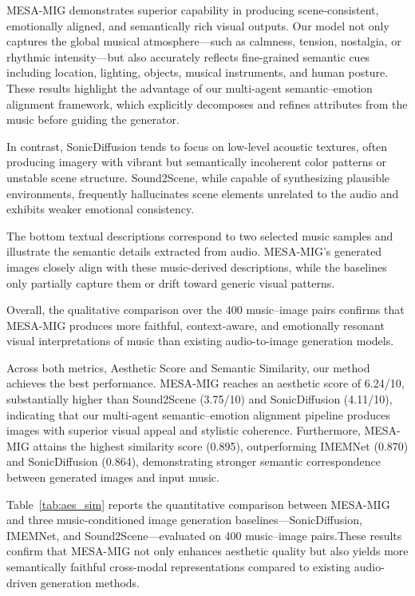 \documentclass[letterpaper]{article}
\begin{document}
MESA-MIG demonstrates superior capability in producing scene-consistent, emotionally aligned, and semantically rich visual outputs. Our model not only captures the global musical atmosphere—such as calmness, tension, nostalgia, or rhythmic intensity—but also accurately reflects fine-grained semantic cues including location, lighting, objects, musical instruments, and human posture. These results highlight the advantage of our multi-agent semantic–emotion alignment framework, which explicitly decomposes and refines attributes from the music before guiding the generator.

In contrast, SonicDiffusion tends to focus on low-level acoustic textures, often producing imagery with vibrant but semantically incoherent color patterns or unstable scene structure. Sound2Scene, while capable of synthesizing plausible environments, frequently hallucinates scene elements unrelated to the audio and exhibits weaker emotional consistency.

The bottom textual descriptions correspond to two selected music samples and illustrate the semantic details extracted from audio. MESA-MIG’s generated images closely align with these music-derived descriptions, while the baselines only partially capture them or drift toward generic visual patterns.

Overall, the qualitative comparison over the 400 music–image pairs confirms that MESA-MIG produces more faithful, context-aware, and emotionally resonant visual interpretations of music than existing audio-to-image generation models.

Across both metrics, Aesthetic Score and Semantic Similarity, our method achieves the best performance. MESA-MIG reaches an aesthetic score of 6.24/10, substantially higher than Sound2Scene (3.75/10) and SonicDiffusion (4.11/10), indicating that our multi-agent semantic–emotion alignment pipeline produces images with superior visual appeal and stylistic coherence. Furthermore, MESA-MIG attains the highest similarity score (0.895), outperforming IMEMNet (0.870) and SonicDiffusion (0.864), demonstrating stronger semantic correspondence between generated images and input music.

Table~\ref{tab:aes_sim} reports the quantitative comparison between MESA-MIG and three music-conditioned image generation baselines—SonicDiffusion, IMEMNet, and Sound2Scene—evaluated on 400 music–image pairs.These results confirm that MESA-MIG not only enhances aesthetic quality but also yields more semantically faithful cross-modal representations compared to existing audio-driven generation methods.
\end{document}
